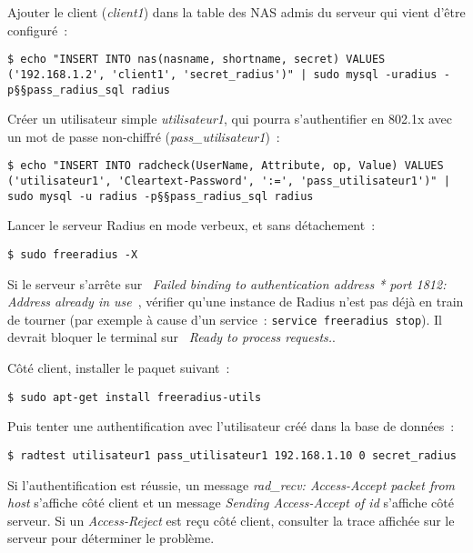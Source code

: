 Ajouter le client (\emph{client1}) dans la table des NAS admis du serveur qui vient d'être configuré~:

\begin{lstlisting}
$ echo "INSERT INTO nas(nasname, shortname, secret) VALUES ('192.168.1.2', 'client1', 'secret_radius')" | sudo mysql -uradius -p§§pass_radius_sql radius
\end{lstlisting}

Créer un utilisateur simple \emph{utilisateur1}, qui pourra s'authentifier en 802.1x avec un mot de passe non-chiffré (\emph{pass\_utilisateur1})~:

\begin{lstlisting}
$ echo "INSERT INTO radcheck(UserName, Attribute, op, Value) VALUES ('utilisateur1', 'Cleartext-Password', ':=', 'pass_utilisateur1')" | sudo mysql -u radius -p§§pass_radius_sql radius
\end{lstlisting}

Lancer le serveur Radius en mode verbeux, et sans détachement~:

\begin{lstlisting}
$ sudo freeradius -X
\end{lstlisting}

Si le serveur s'arrête sur \og~\emph{Failed binding to authentication address * port 1812{}: Address already in use}~\fg{}, vérifier qu'une instance de Radius n'est pas déjà en train de tourner (par exemple à cause d'un service~: \texttt{service freeradius stop}). Il devrait bloquer le terminal sur \og~\emph{Ready to process requests.}\fg{}.

Côté client, installer le paquet suivant~:

\begin{lstlisting}
$ sudo apt-get install freeradius-utils
\end{lstlisting}

Puis tenter une authentification avec l'utilisateur créé dans la base de données~:

\begin{lstlisting}
$ radtest utilisateur1 pass_utilisateur1 192.168.1.10 0 secret_radius
\end{lstlisting}

Si l'authentification est réussie, un message \og\emph{rad\_recv: Access-Accept packet from host}\fg{} s'affiche côté client et un message \og\emph{Sending Access-Accept of id}\fg{} s'affiche côté serveur. Si un \emph{Access-Reject} est reçu côté client, consulter la trace affichée sur le serveur pour déterminer le problème.

